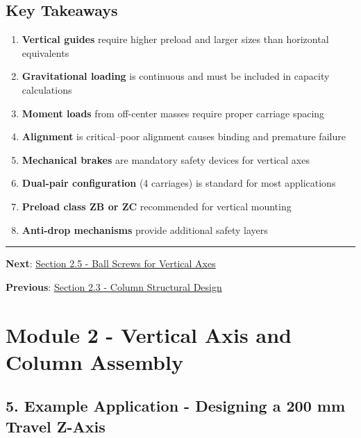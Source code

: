 \documentclass[
]{article}
\providecommand{\tightlist}{%
  \setlength{\itemsep}{0pt}\setlength{\parskip}{0pt}}
\begin{document}
\subsection{Key Takeaways}\label{key-takeaways-2}

\begin{enumerate}
\def\labelenumi{\arabic{enumi}.}
\tightlist
\item
  \textbf{Vertical guides} require higher preload and larger sizes than
  horizontal equivalents
\item
  \textbf{Gravitational loading} is continuous and must be included in
  capacity calculations
\item
  \textbf{Moment loads} from off-center masses require proper carriage
  spacing
\item
  \textbf{Alignment} is critical--poor alignment causes binding and
  premature failure
\item
  \textbf{Mechanical brakes} are mandatory safety devices for vertical
  axes
\item
  \textbf{Dual-pair configuration} (4 carriages) is standard for most
  applications
\item
  \textbf{Preload class ZB or ZC} recommended for vertical mounting
\item
  \textbf{Anti-drop mechanisms} provide additional safety layers
\end{enumerate}

\begin{center}\rule{0.5\linewidth}{0.5pt}\end{center}

\textbf{Next}: \href{section-2.5-ball-screw-vertical.md}{Section 2.5 -
Ball Screws for Vertical Axes}

\textbf{Previous}:
\href{section-2.3-column-structural-design.md}{Section 2.3 - Column
Structural Design}

\newpage

\section{Module 2 - Vertical Axis and Column
Assembly}\label{module-2---vertical-axis-and-column-assembly-3}

\subsection{5. Example Application - Designing a 200 mm Travel
Z-Axis}\label{example-application---designing-a-200-mm-travel-z-axis}
\end{document}
